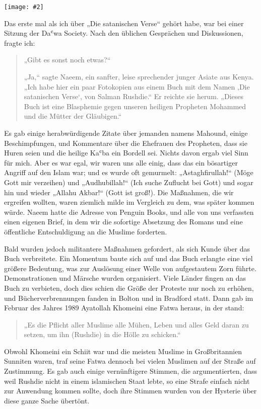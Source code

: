 \documentclass[12pt]{memoir}
\def\`{ʿ} %
\newcommand{\img}[3]{\begin{center}%
\texttt{[image: \#2]}\\{\small\em#3}%
\end{center}}
\begin{document}
\img{scale=1}{Satanic_Verses_Demo.jpg}{}

Das erste mal als ich über „Die satanischen Verse“ gehört habe,
war bei einer Sitzung der Da\`wa Society.
Nach den üblichen Gesprächen und Diskussionen, fragte ich:

\begin{quote}
„Gibt es sonst noch etwas?“

„Ja,“ sagte Naeem, ein sanfter, leise sprechender junger Asiate aus Kenya.
„Ich habe hier ein paar Fotokopien aus einem Buch
mit dem Namen ‚Die satanischen Verse‘, von Salman Rushdie.“
Er reichte sie herum.
„Dieses Buch ist eine Blasphemie gegen unseren heiligen Propheten Mohammed
und die Mütter der Gläubigen.“
\end{quote}

Es gab einige herabwürdigende Zitate über jemanden namens Mahound,
einige Beschimpfungen, und Kommentare über die Ehefrauen des Propheten,
dass sie Huren seien und die heilige Ka\`ba ein Bordell sei.
Nichts davon ergab viel Sinn für mich.
Aber es war egal, wir waren uns alle einig,
dass das ein bösartiger Angriff auf den Islam war;
und es wurde oft gemurmelt:
„Astaghfirullah!“ (Möge Gott mir verzeihen) und
„Audhubillah!“ (Ich suche Zuflucht bei Gott)
und sogar hin und wieder „Allahu Akbar!“ (Gott ist groß!).
Die Maßnahmen, die wir ergreifen wollten, waren ziemlich milde
im Vergleich zu dem, was später kommen würde.
Naeem hatte die Adresse von Penguin Books,
und alle von uns verfassten einen eigenen Brief,
in dem wir die sofortige Absetzung des Romans
und eine öffentliche Entschuldigung an die Muslime forderten.

Bald wurden jedoch militantere Maßnahmen gefordert,
als sich Kunde über das Buch verbreitete.
Ein Momentum baute sich auf und das Buch erlangte eine viel größere Bedeutung,
was zur Auslösung einer Welle von aufgestautem Zorn führte.
Demonstrationen und Märsche wurden organisiert.
Viele Länder fingen an das Buch zu verbieten,
doch dies schien die Größe der Proteste nur noch zu erhöhen,
und Bücherverbrennungen fanden in Bolton und in Bradford statt.
Dann gab im Februar des Jahres 1989 Ayatollah Khomeini
eine Fatwa heraus, in der stand:

\begin{quote}
„Es die Pflicht aller Muslime alle Mühen, Leben und alles Geld
daran zu setzen, um ihn (Rushdie) in die Hölle zu schicken.“
\end{quote}

Obwohl Khomeini ein Schiit war und die meisten Muslime
in Großbritannien Sunniten waren,
traf seine Fatwa dennoch bei vielen Muslimen auf der Straße auf Zustimmung.
Es gab auch einige vernünftigere Stimmen,
die argumentierten, dass weil Rushdie nicht in einem islamischen Staat lebte,
so eine Strafe einfach nicht zur Anwendung kommen sollte,
doch ihre Stimmen wurden von der Hysterie über diese ganze Sache übertönt.
\end{document}

